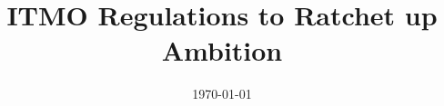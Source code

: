 \documentclass[12pt,english]{article}
\title{ITMO Regulations to Ratchet up Ambition
} %
\date{\today} %
\newcommand{\bo}[1]{\textbf{#1}}
\begin{document}
\sloppy
\maketitle



\end{document}
